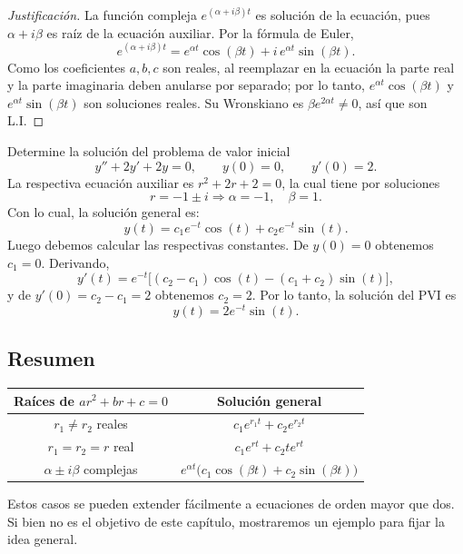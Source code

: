 \begin{proof}[Justificaci\'on]
    La funci\'on compleja $e^{(\alpha+i\beta)t}$ es soluci\'on de la ecuaci\'on, pues $\alpha+i\beta$ es ra\'iz de la ecuaci\'on auxiliar. Por la f\'ormula de Euler,
    \[
    e^{(\alpha+i\beta)t}=e^{\alpha t}\cos(\beta t)+i\,e^{\alpha t}\sin(\beta t).
    \]
    Como los coeficientes $a,b,c$ son reales, al reemplazar en la ecuaci\'on la parte real y la parte imaginaria deben anularse por separado; por lo tanto, $e^{\alpha t}\cos(\beta t)$ y $e^{\alpha t}\sin(\beta t)$ son soluciones reales. Su Wronskiano es $\beta e^{2\alpha t}\neq 0$, as\'i que son L.I.
\end{proof}

\begin{example}
    Determine la soluci\'on del problema de valor inicial
    \[
    y''+2y'+2y=0,\qquad y(0)=0,\qquad y'(0)=2.
    \]
    La respectiva ecuaci\'on auxiliar es $r^2+2r+2=0$, la cual tiene por soluciones
    \[
    r=-1\pm i\Longrightarrow \alpha=-1,\quad \beta=1.
    \]
    Con lo cual, la soluci\'on general es:
    \[
    y(t)=c_1e^{-t}\cos(t)+c_2e^{-t}\sin(t).
    \]
    Luego debemos calcular las respectivas constantes. De $y(0)=0$ obtenemos $c_1=0$. Derivando,
    \[
    y'(t)=e^{-t}\big[(c_2-c_1)\cos(t)-(c_1+c_2)\sin(t)\big],
    \]
    y de $y'(0)=c_2-c_1=2$ obtenemos $c_2=2$. Por lo tanto, la soluci\'on del PVI es
    \[
    y(t)=2e^{-t}\sin(t).
    \]
\end{example}

\subsection*{Resumen}

\begin{center}
\renewcommand{\arraystretch}{1.4}
\begin{tabular}{|c|c|}
\hline
\textbf{Ra\'ices de } $ar^2+br+c=0$ & \textbf{Soluci\'on general} \\ \hline
$r_1\neq r_2$ reales & $c_1e^{r_1t}+c_2e^{r_2t}$ \\ \hline
$r_1=r_2=r$ real & $c_1e^{rt}+c_2te^{rt}$ \\ \hline
$\alpha\pm i\beta$ complejas & $e^{\alpha t}\big(c_1\cos(\beta t)+c_2\sin(\beta t)\big)$ \\ \hline
\end{tabular}
\end{center}

Estos casos se pueden extender f\'acilmente a ecuaciones de orden mayor que dos. Si bien no es el objetivo de este cap\'itulo, mostraremos un ejemplo para fijar la idea general.

